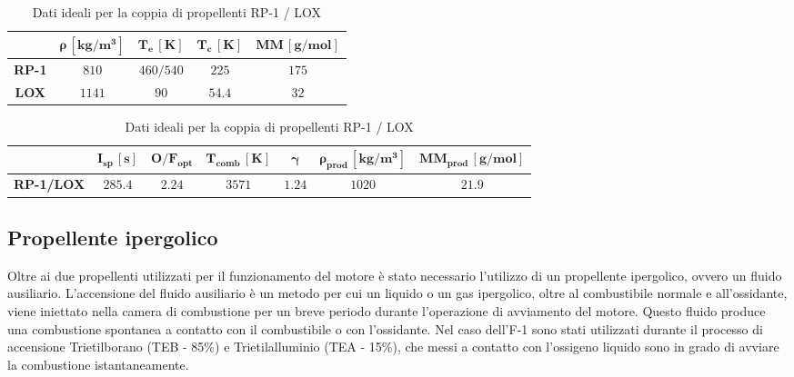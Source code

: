 \begin{table}[H]

\centering
\begin{tabular}{|c|c|c|c|c|}
\hline
& $\bm{\rho \, [kg/m^3]}$ & $\bm{T_{e} \, [K]}$ & $\bm{T_{c} \, [K]}$ & $\bm{MM \, [g/mol]}$ \\
\hline
\textbf{RP-1} & $810$ & $460 / 540$ & $225$ & $175$ \\
\hline
\textbf{LOX} & $1141$ & $90$ & $54.4$ & $32$ \\
\hline
\end{tabular}

\vspace{5pt}

\begin{tabular}{|c|c|c|c|c|c|c|}
\hline
& $\bm{I_{sp} \, [s]}$ & $\bm{O/F_{opt}}$ & $\bm{T_{comb} \, [K]}$ & $\bm{\gamma}$ & $\bm{\rho_{prod} \, [kg/m^3]}$ & $\bm{MM_{prod} \, [g/mol]}$ \\
\hline
\textbf{RP-1/LOX} & $285.4$ & $2.24$ & $3571$ & $1.24$ & $1020$ & $21.9$ \\
\hline
\end{tabular}

\caption{Dati ideali per la coppia di propellenti RP-1 / LOX}
\label{table:dati_propellenti}

\end{table}

\subsection{Propellente ipergolico}
\label{subsec:propellente_ipergolico}

Oltre ai due propellenti utilizzati per il funzionamento del motore è stato necessario l’utilizzo di un propellente ipergolico, ovvero un fluido ausiliario.
L'accensione del fluido ausiliario è un metodo per cui un liquido o un gas ipergolico, oltre al combustibile normale e all'ossidante, viene iniettato nella camera di combustione per un breve periodo durante l'operazione di avviamento del motore. Questo fluido produce una combustione spontanea a contatto con il combustibile o con l'ossidante.
Nel caso dell’F-1 sono stati utilizzati durante il processo di accensione Trietilborano (TEB - 85\%) e Trietilalluminio (TEA - 15\%), che messi a contatto con l’ossigeno liquido sono in grado di avviare la combustione istantaneamente.